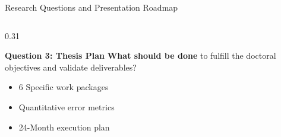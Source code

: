 \documentclass[aspectratio=169,10pt]{beamer}
\begin{document}
\begin{frame}{Research Questions and Presentation Roadmap}
\begin{columns}[t]
        \begin{column}{0.31\textwidth}
            \begin{alertblock}{\textbf{Question 3: Thesis Plan}}
                \small
                \textbf{What should be done} to fulfill the doctoral objectives and validate deliverables?
                \begin{itemize}
                    \setlength{\itemsep}{2pt}
                    \item 6 Specific work packages
                    \item Quantitative error metrics
                    \item 24-Month execution plan
                \end{itemize}
            \end{alertblock}
        \end{column}
    \end{columns}
\end{frame}
\end{document}
